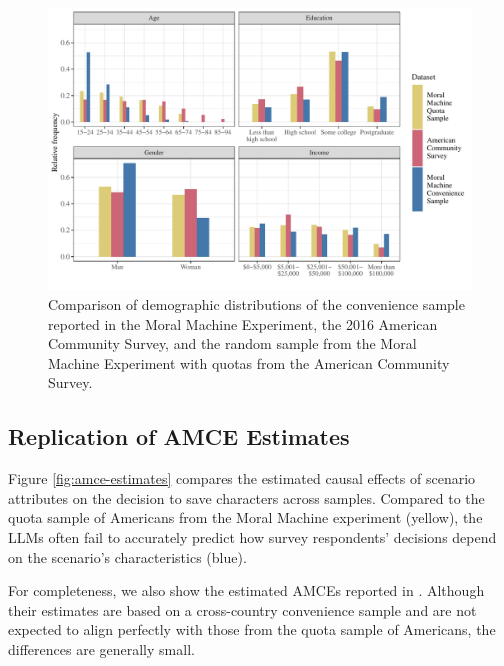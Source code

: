 \begin{figure}[H]
    \centering
    \includegraphics[width=1\linewidth]{2_DemographicDistribution.pdf}
    \caption{Comparison of demographic distributions of the convenience sample reported in the Moral Machine Experiment, the 2016 American Community Survey, and the random sample from the Moral Machine Experiment with quotas from the American Community Survey.}
    \label{fig:demographic-distribution}
\end{figure}

\newpage

\subsection{Replication of AMCE Estimates}

Figure \ref{fig:amce-estimates} compares the estimated causal effects of scenario attributes on the decision to save characters across samples. Compared to the quota sample of Americans from the Moral Machine experiment (yellow), the LLMs often fail to accurately predict how survey respondents' decisions depend on the scenario's characteristics (blue). 

For completeness, we also show the estimated AMCEs reported in \citet{awad_moral_2018}. Although their estimates are based on a cross-country convenience sample and are not expected to align perfectly with those from the quota sample of Americans, the differences are generally small.
\vspace{10pt}


